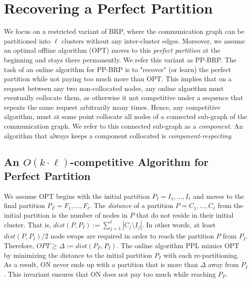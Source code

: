 \documentclass[manuscript,screen=true]{acmart}
\newcommand{\OPT}{\mathit{OPT}}
\newcommand{\OBRP}{BRP}
\newcommand{\PPOBRP}{PP-BRP}
\newcommand\mahmoud[1]{\color{green}\textbf{\\ Mahmoud: #1}\\\color{black}}
\newcommand\maciek[1]{\color{brown}\textbf{\\ Maciek: #1}\color{black}}
\begin{document}
\section{Recovering a Perfect Partition}	\label{sec:ppl}
We  focus on a restricted variant of  \OBRP{},
where the communication graph can be partitioned into $\ell$ clusters without any inter-cluster edges.
Moreover, we assume an optimal offline algorithm (OPT) moves to this \emph{perfect partition}
at the beginning and stays there permanently.
We refer this variant as \PPOBRP{}.
The task of an online algorithm for \PPOBRP{} is to "recover" (or learn) the perfect partition while not paying too much more than OPT.
This implies that on a request between any two non-collocated nodes,
any online algorithm must eventually collocate them,
as otherwise it not competitive under a sequence that repeats the same request arbitrarily many times.
Hence,
any competitive algorithm,
must at some point collocate all nodes of a  connected sub-graph of the communication graph.
We refer to this connected sub-graph as a \emph{component}.
An algorithm that always keeps a component collocated is \emph{component-respecting}.

\subsection{An $O(k\cdot \ell)$-competitive Algorithm for Perfect Partition}
     
We assume OPT begins with the initial partition
$P_I = I_1, \dots, I_{\ell}$ and moves to the final partition
$P_F = F_1, \dots, F_{\ell}$.
 The \emph{distance} of a partition $P = C_1, \dots, C_{\ell}$ from the initial partition is the number of nodes in $P$ that do not reside in their initial cluster.
    That is,
    $\mathit{dist}(P, P_I) := \sum_{j=1}^{\ell} | C_j \setminus I_j |$. 
In other words,
at least $\mathit{dist}(P, P_I)/2$ node swaps are required in order to reach the partition $P$ from $P_I$.
Therefore,
$\OPT \geq \Delta:= dist(P_F, P_I) $.
The online algorithm PPL mimics OPT by minimizing the distance to the initial partition $P_I$ with each re-partitioning.
As a result,
ON never ends up with a partition that is more than $\Delta$ away from $P_I$.
This invariant ensures that ON does not pay too much while reaching $P_F$.
\end{document}
